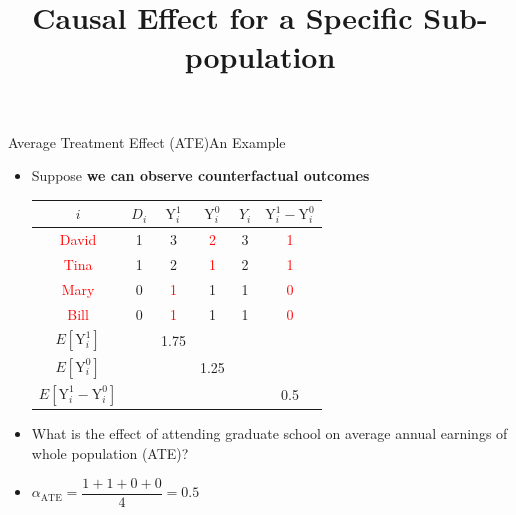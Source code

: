 \documentclass[hyperref={pdfpagelabels=false}]{beamer}
\begin{document}
\begin{frame}{Average Treatment Effect (ATE)}{An Example}
\begin{itemize}
\item Suppose \textbf{we can observe counterfactual outcomes}
\vspace{0.2cm}
\begin{center}
	\begin{threeparttable}
		\centering\footnotesize
		\begin{tabular}{cccccc}
			\toprule
			$i$ & $D_i$ & $\mathrm{Y}^{1}_{i}$ & $\mathrm{Y}^{0}_{i}$ & $Y_i$ & $\mathrm{Y}^{1}_{i}-\mathrm{Y}^{0}_{i}$  \\
			\midrule
		\textcolor{red}{David} & 1 & 3 & \textcolor{red}{2} & 3 & \textcolor{red}{1} \\
		\textcolor{red}{Tina} & 1 & 2 & \textcolor{red}{1} & 2 & \textcolor{red}{1} \\
		\textcolor{red}{Mary} & 0 & \textcolor{red}{1} & 1 & 1 & \textcolor{red}{0} \\
		\textcolor{red}{Bill} & 0 & \textcolor{red}{1} & 1 & 1 & \textcolor{red}{0} \\
			\midrule
			$E[\mathrm{Y}^{1}_{i}]$     & & 1.75 &     &  &     \\
			$E[\mathrm{Y}^{0}_{i}]$     &     & & 1.25 &  &     \\
			\midrule
			$E[\mathrm{Y}^{1}_{i}-\mathrm{Y}^{0}_{i}]$ &     &     &  &  & 0.5 \\
			\bottomrule
		\end{tabular}
	\end{threeparttable}
\end{center}
\vspace{0.2cm}
\item What is the effect of attending graduate school on average annual earnings of whole population (ATE)?
\vspace{0.2cm}

\item $\alpha_{\text{ATE}}= \dfrac{1+1+0+0}{4} = 0.5$
\end{itemize}

\end{frame}





\title[]  
{Causal Effect for a Specific Sub-population}


\author 
{}

\institute{}
\end{document}
